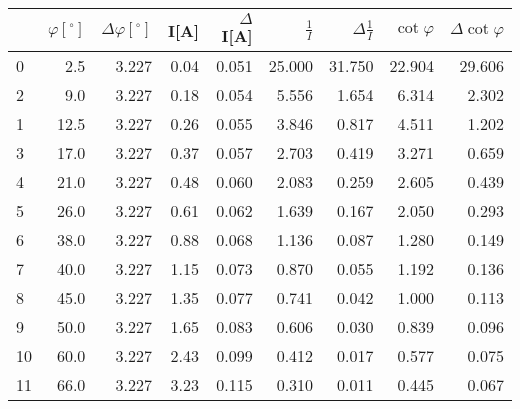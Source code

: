 \begin{tabular}{lrrrrrrrr}
\toprule
{} &  $\varphi[^\circ]$ &  $\Delta \varphi[^\circ]$ &  I[A] &  $\Delta$I[A] &  $\frac{1}{I}$ &  $\Delta \frac{1}{I}$ &  $\cot{\varphi}$ &  $\Delta \cot{\varphi}$ \\
\midrule
0  &                2.5 &                     3.227 &  0.04 &         0.051 &         25.000 &                31.750 &           22.904 &                  29.606 \\
2  &                9.0 &                     3.227 &  0.18 &         0.054 &          5.556 &                 1.654 &            6.314 &                   2.302 \\
1  &               12.5 &                     3.227 &  0.26 &         0.055 &          3.846 &                 0.817 &            4.511 &                   1.202 \\
3  &               17.0 &                     3.227 &  0.37 &         0.057 &          2.703 &                 0.419 &            3.271 &                   0.659 \\
4  &               21.0 &                     3.227 &  0.48 &         0.060 &          2.083 &                 0.259 &            2.605 &                   0.439 \\
5  &               26.0 &                     3.227 &  0.61 &         0.062 &          1.639 &                 0.167 &            2.050 &                   0.293 \\
6  &               38.0 &                     3.227 &  0.88 &         0.068 &          1.136 &                 0.087 &            1.280 &                   0.149 \\
7  &               40.0 &                     3.227 &  1.15 &         0.073 &          0.870 &                 0.055 &            1.192 &                   0.136 \\
8  &               45.0 &                     3.227 &  1.35 &         0.077 &          0.741 &                 0.042 &            1.000 &                   0.113 \\
9  &               50.0 &                     3.227 &  1.65 &         0.083 &          0.606 &                 0.030 &            0.839 &                   0.096 \\
10 &               60.0 &                     3.227 &  2.43 &         0.099 &          0.412 &                 0.017 &            0.577 &                   0.075 \\
11 &               66.0 &                     3.227 &  3.23 &         0.115 &          0.310 &                 0.011 &            0.445 &                   0.067 \\
\bottomrule
\end{tabular}
